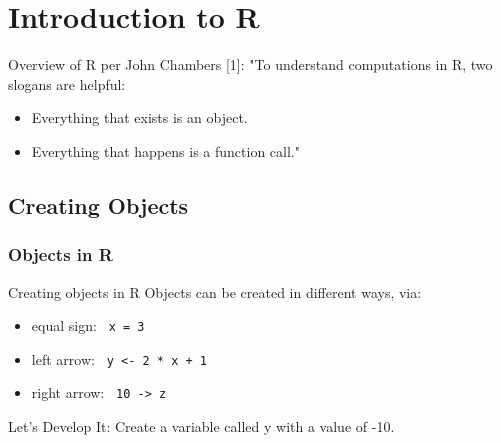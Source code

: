 \section{Introduction to R}
\begin{frame}
	\begin{center}
  		\begin{block}{Overview of R per John Chambers [1]:} 
			"To understand computations in R, two slogans are helpful:
			\begin{itemize}
			        \item Everything that exists is an object.
			        \item Everything that happens is a function call."
			\end{itemize}
		\end{block}
	\end{center} 

\end{frame}

\subsection{Creating Objects}
\begin{frame}
	\frametitle{Objects in R}
		\begin{block}{Creating objects in R}
Objects can be created in different ways, via:
			\begin{itemize}
				\item equal sign: \lstinline$ x = 3 $
				\item left arrow: \lstinline$ y <- 2 * x + 1 $
				\item right arrow: \lstinline$ 10 -> z $
			\end{itemize}
		\end{block}

\newpage
	\begin{alertblock}{Let's Develop It:}
		Create a variable called y with a value of -10.
	\end{alertblock}
\end{frame}

